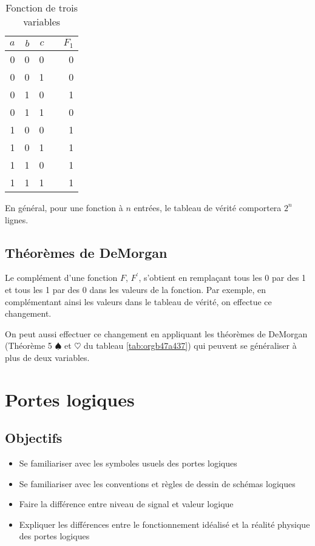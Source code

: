 \documentclass[letter, oneside]{book}
\begin{document}
\begin{enumerate}
\begin{table}[htbp]
\caption{\label{tab:org63254ff}Fonction de trois variables}
\centering
\begin{tabular}{rrrlr}
\(a\) & \(b\) & \(c\) &  & \(F_1\)\\[0pt]
\hline
0 & 0 & 0 &  & 0\\[0pt]
0 & 0 & 1 &  & 0\\[0pt]
0 & 1 & 0 &  & 1\\[0pt]
0 & 1 & 1 &  & 0\\[0pt]
1 & 0 & 0 &  & 1\\[0pt]
1 & 0 & 1 &  & 1\\[0pt]
1 & 1 & 0 &  & 1\\[0pt]
1 & 1 & 1 &  & 1\\[0pt]
\end{tabular}
\end{table}

En général, pour une fonction à \(n\) entrées, le tableau de vérité
comportera \(2^n\) lignes.
\end{enumerate}

\section{Théorèmes de DeMorgan}
\label{sec:org3aa343f}

Le complément d'une fonction \(F\), \(F^\prime\), s'obtient en
remplaçant tous les 0 par des 1 et tous les 1 par des 0 dans les
valeurs de la fonction. Par exemple, en complémentant ainsi les
valeurs dans le tableau de vérité, on effectue ce changement.

On peut aussi effectuer ce changement en appliquant les théorèmes de
DeMorgan (Théorème 5 \(\spadesuit\) et \(\heartsuit\) du tableau \ref{tab:orgb47a437}) qui
peuvent se généraliser à plus de deux variables.

\chapter{Portes logiques}
\label{sec:org69416e1}

\section{Objectifs}
\label{sec:org6823507}
\begin{itemize}
\item Se familiariser avec les symboles usuels des portes logiques
\item Se familiariser avec les conventions et règles de dessin de schémas
logiques
\item Faire la différence entre niveau de signal et valeur logique
\item Expliquer les différences entre le fonctionnement idéalisé
et la réalité physique des portes logiques
\end{itemize}
\end{document}
